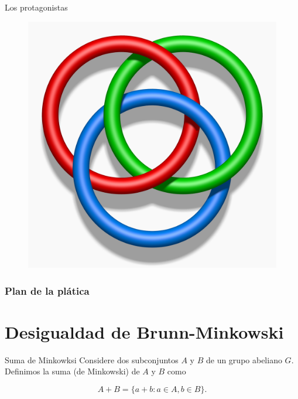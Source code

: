 \documentclass{beamer}
\begin{document}
\begin{frame}{Los protagonistas}
\begin{figure}
\begin{multicols}{2}
    \includegraphics[width=\linewidth]{pics/rings.png}\par 
    \end{multicols}
    \end{figure}
    
\end{frame}



\begin{frame}
\frametitle{Plan de la plática}
\tableofcontents
\end{frame}

\section{Desigualdad de Brunn-Minkowski}
\begin{frame}{Suma de Minkowksi}
    Considere dos subconjuntos $A$ y $B$ de un grupo abeliano $G.$ Definimos la suma (de Minkowski) de $A$ y $B$ como 

    $$ A + B = \{a+b: a \in A, b \in B\}.$$
\end{frame}
\end{document}
